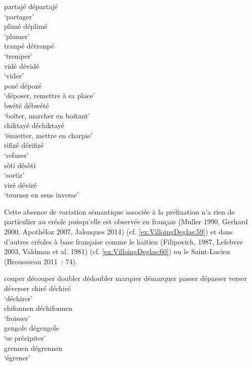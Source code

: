 \documentclass[output=paper]{langsci/langscibook}
\begin{document}
\ea \label{ex:VilloingDeglas:58a}
      \ea \gll partajé \textrightarrow{} départajé\\
        {`partager'}\\
      \ex \gll  plimé \textrightarrow{} déplimé\\
        {`plumer'}\\
      \ex \gll  tranpé \textrightarrow{} détranpé\\
        {`tremper'}\\
      \ex \gll  vidé \textrightarrow{} dévidé\\
        {`vider'}\\
      \ex   pozé \textrightarrow{} dépozé\\
        {`déposer, remettre à sa place'}\\
      \z
\ex\label{ex:VilloingDeglas:58b}
      \ea   bwété \textrightarrow{} débwété\\
        {`boîter, marcher en boitant'}\\
      \ex   chiktayé \textrightarrow{} déchiktayé\\
        {`émietter, mettre en charpie'}\\
      \ex \gll  rifizé \textrightarrow{} dérifizé\\
        {`refuser'}\\
      \ex \gll  sòti \textrightarrow{} désòti\\
        {`sortir'}\\
      \ex   viré \textrightarrow{} déviré\\
        {`tourner en sens inverse'}\\
\z\z


Cette absence de variation sémantique associée à la préfixation n'a rien
de particulier au créole puisqu'elle est observée en français (Muller
1990, Gerhard 2000, Apothéloz 2007, Jalenques 2014) (cf. \ref{ex:VilloingDeglas:59}) et dans
d'autres créoles à base française comme le haïtien (Filipovich, 1987,
Lefebvre 2003, Valdman et al. 1981) (cf. \ref{ex:VilloingDeglas:60}) ou le Saint-Lucien
(Broussseau 2011~: 74).

\ea \label{ex:VilloingDeglas:59}
      \ea couper \textrightarrow{} découper
      \ex  doubler \textrightarrow{} dédoubler
      \ex  marquer \textrightarrow{} démarquer
      \ex passer \textrightarrow{} dépasser
      \ex verser \textrightarrow{} déverser
      \z
\ex \label{ex:VilloingDeglas:60}
      \ea chiré \textrightarrow{} déchiré \\
      \glt `déchirer' \\
      \ex chifonnen \textrightarrow{} déchifonnen \\
      \glt `froisser' \\
      \ex gengole \textrightarrow{} dégengole \\
      \glt `se précipiter' \\
      \ex grennen \textrightarrow{} dégrennen \\
      \glt `égrener' \\
      \z
\z
\end{document}
